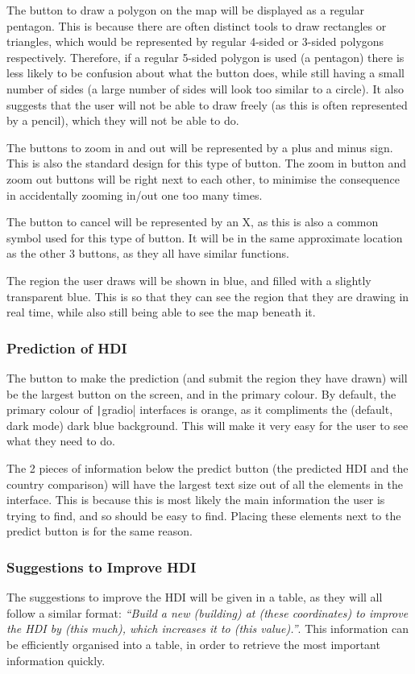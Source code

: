 \documentclass[12pt]{report}
\newcommand{\pil}[1]{\texttt|#1|}
\begin{document}
The button to draw a polygon on the map will be displayed as a regular pentagon. This is because there are often distinct tools to draw rectangles or triangles, which would be represented by regular 4-sided or 3-sided polygons respectively. Therefore, if a regular 5-sided polygon is used (a pentagon) there is less likely to be confusion about what the button does, while still having a small number of sides (a large number of sides will look too similar to a circle). It also suggests that the user will not be able to draw freely (as this is often represented by a pencil), which they will not be able to do.

The buttons to zoom in and out will be represented by a plus and minus sign. This is also the standard design for this type of button. The zoom in button and zoom out buttons will be right next to each other, to minimise the consequence in accidentally zooming in/out one too many times.

The button to cancel will be represented by an X, as this is also a common symbol used for this type of button. It will be in the same approximate location as the other 3 buttons, as they all have similar functions.

The region the user draws will be shown in blue, and filled with a slightly transparent blue. This is so that they can see the region that they are drawing in real time, while also still being able to see the map beneath it.

\subsubsection{Prediction of HDI}
The button to make the prediction (and submit the region they have drawn) will be the largest button on the screen, and in the primary colour. By default, the primary colour of \pil{gradio} interfaces is orange, as it compliments the (default, dark mode) dark blue background. This will make it very easy for the user to see what they need to do.

The 2 pieces of information below the predict button (the predicted HDI and the country comparison) will have the largest text size out of all the elements in the interface. This is because this is most likely the main information the user is trying to find, and so should be easy to find. Placing these elements next to the predict button is for the same reason.

\subsubsection{Suggestions to Improve HDI}
The suggestions to improve the HDI will be given in a table, as they will all follow a similar format: \textit{``Build a new (building) at (these coordinates) to improve the HDI by (this much), which increases it to (this value).''}. This information can be efficiently organised into a table, in order to retrieve the most important information quickly.
\end{document}
